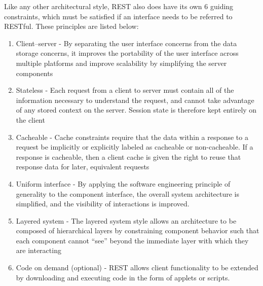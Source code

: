 Like any other architectural style, REST also does have its own 6 guiding constraints, which must be satisfied if an interface needs to be referred to RESTful. These principles are listed below:
\begin{enumerate}
  \item Client–server - By separating the user interface concerns from the data storage concerns, it improves the portability of the user interface across multiple platforms and improve scalability by simplifying the server components
  \item Stateless - Each request from a client to server must contain all of the information necessary to understand the request, and cannot take advantage of any stored context on the server. Session state is therefore kept entirely on the client
  \item Cacheable - Cache constraints require that the data within a response to a request be implicitly or explicitly labeled as cacheable or non-cacheable. If a response is cacheable, then a client cache is given the right to reuse that response data for later, equivalent requests
  \item Uniform interface - By applying the software engineering principle of generality to the component interface, the overall system architecture is simplified, and the visibility of interactions is improved.
  \item Layered system - The layered system style allows an architecture to be composed of hierarchical layers by constraining component behavior such that each component cannot ``see'' beyond the immediate layer with which they are interacting
  \item Code on demand (optional) - REST allows client functionality to be extended by downloading and executing code in the form of applets or scripts.
\end{enumerate}

